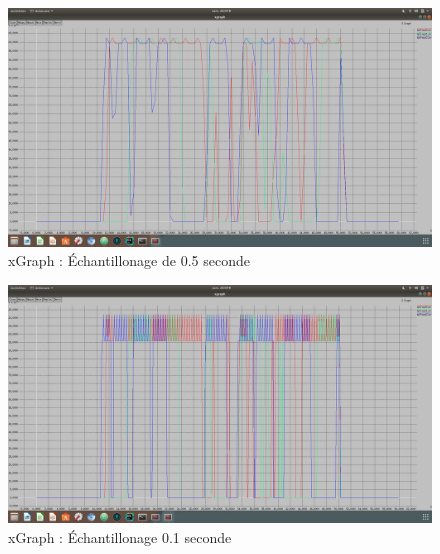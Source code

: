   \begin{figure}
    \centering
      \includegraphics[width=0.99\columnwidth]{./tp3/0,5.png}
      \caption{xGraph : Échantillonage de 0.5 seconde}
  \end{figure}

  \begin{figure}
    \centering
      \includegraphics[width=0.99\columnwidth]{./tp3/0,1.png}
      \caption{xGraph : Échantillonage 0.1 seconde}
  \end{figure}

